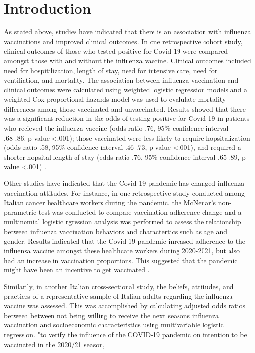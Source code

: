 \documentclass[12pt]{article}
\begin{document}
\section{Introduction}
\label{sec:Introduction}
As stated above, studies have indicated that there is an association with influenza vaccinations and improved clinical outcomes. In one retrospective cohort study, clinical outcomes of those who tested
positive for Covid-19 were compared amongst those with and without the influenza vaccine. Clinical outcomes included need for hospitilization, length of stay, need for intensive care, need for ventiliation,
and mortality. The association between influenza vaccination and clinical outcomes were calculated using weighted logistic regression models and a weighted Cox proportional hazards model was used to evalulate
mortality differences among those vaccinated and unvaccinated. Results showed that there was a significant reduction in the odds of testing positive for Covid-19 in patients who recieved the influenza vaccine
(odds ratio .76, 95\% confidence interval .68-.86, p-value <.001); those vaccinated were less likely to require hopsitalization (odds ratio .58, 95\% confidence interval .46-.73, p-value <.001), and required a
shorter hopsital length of stay (odds ratio .76, 95\% confidence interval .65-.89, p-value <.001) \citep{conlon2021impact}. \par
Other studies have indicated that the Covid-19 pandemic has changed influenza vaccination attitudes. For instance, in one retrospective study conducted among Italian cancer healthcare workers during the pandemic, the McNenar's non-parametric
test was conducted to compare vaccination adherence change and a multinomial logistic rgression analysis was performed to assess the relationship between influenza vaccination behaviors and charactertics such as age and gender. Results indicated
that the Covid-19 pandemic inreased adherence to the influenza vaccine amongst these healthcare workers during 2020-2021, but also had an increase in vaccination proportions. This suggested that the pandemic might have been an incentive to get vaccinated
\citep{bertoni2022has}. \par
Similarily, in another Italian cross-sectional study, the beliefs, attitudes, and practices of a representative sample of Italian adults regarding the influenza vaccine was assessed. This was accomplished by calculating adjusted odds ratios between
between not being willing to receive the next seasons influenza vaccination and socioeconomic characteristics using multivariable logistic regression. "to verify the influence of the COVID-19 pandemic on intention to be vaccinated in the 2020/21 season, 
\end{document}
